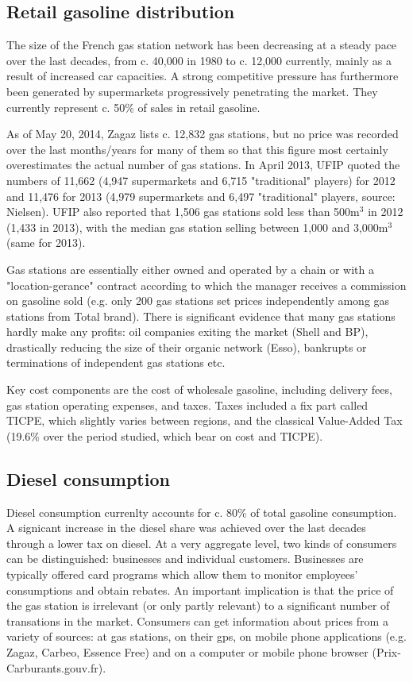 \documentclass[11pt]{article}
\begin{document}
\subsection{Retail gasoline distribution}

The size of the French gas station network has been decreasing at a steady pace over the last decades, from c. 40,000 in 1980 to c. 12,000 currently, mainly as a result of increased car capacities.  A strong competitive pressure has furthermore been generated by supermarkets progressively penetrating the market. They currently represent c. 50\% of sales in retail gasoline.

As of May 20, 2014, Zagaz lists c. 12,832 gas stations, but no price was recorded over the last months/years for many of them so that this figure most certainly overestimates the actual number of gas stations. In April 2013, UFIP quoted the numbers of 11,662 (4,947 supermarkets and 6,715 "traditional" players) for 2012 and 11,476 for 2013 (4,979 supermarkets and 6,497 "traditional" players, source: Nielsen). UFIP also reported that 1,506 gas stations sold less than 500m$^{3}$ in 2012 (1,433 in 2013), with the median gas station selling between 1,000 and 3,000m$^{3}$ (same for 2013).

Gas stations are essentially either owned and operated by a chain or with a "location-gerance" contract according to which the manager receives a commission on gasoline sold (e.g. only 200 gas stations set prices independently among gas stations from Total brand). There is significant evidence that many gas stations hardly make any profits: oil companies exiting the market (Shell and BP), drastically reducing the size of their organic network (Esso), bankrupts or terminations of independent gas stations etc.

Key cost components are the cost of wholesale gasoline, including delivery fees,  gas station operating expenses, and taxes. Taxes included a fix part called TICPE, which slightly varies between regions, and the classical Value-Added Tax (19.6\% over the period studied, which bear on cost and TICPE).

\subsection{Diesel consumption}

Diesel consumption currenlty accounts for c. 80\% of total gasoline consumption. A signicant increase in the diesel share was achieved over the last decades through a lower tax on diesel. At a very aggregate level, two kinds of consumers can be distinguished: businesses and individual customers. Businesses are typically offered card programs which allow them to monitor employees' consumptions and obtain rebates. An important implication is that the price of the gas station is irrelevant (or only partly relevant) to a significant number of transations in the market.
Consumers can get information about prices from a variety of sources: at gas stations, on their gps, on mobile phone applications (e.g. Zagaz, Carbeo, Essence Free) and on a computer or mobile phone browser (Prix-Carburants.gouv.fr).
\end{document}

